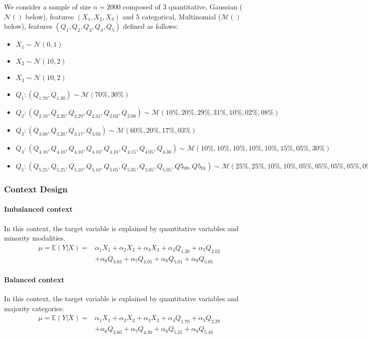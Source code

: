 \documentclass{article}
\theoremstyle{definition}
\begin{document}
We consider a sample of size $n=2000$ composed of 3 quantitative, Gaussian ($\mathcal{N}()$ below), features $(X_1, X_2, X_3)$ and 5 categorical, Multinomial  ($\mathcal{M}()$ below), features $(Q_1, Q_2, Q_3, Q_3, Q_5)$ defined as follows:
{\scriptsize
\begin{itemize}
    \item $X_1 \sim \mathcal{N}(0,1)$
    \item $X_2 \sim \mathcal{N}(10,2)$
    \item $X_3 \sim \mathcal{N}(10,2)$
    \item $Q_1 : (Q_1.70, Q_1.30) \sim \mathcal{M}(70\%, 30\%)$
    \item $Q_2 : (Q_2.10, Q_2.20, Q_2.29, Q_2.31, Q_2.02, Q_2.08) \sim \mathcal{M}(10\%, 20\%, 29\%, 31\%, 10\%, 02\%, 08\%)$
    \item $Q_3 : (Q_3.60, Q_3.20, Q_3.17, Q_3.03) \sim \mathcal{M}(60\%, 20\%, 17\%, 03\%)$
    \item $Q_4 : (Q_4.10, Q_4.10, Q_4.10, Q_4.10, Q_4.10, Q_4.15, Q_4.05,Q_4.30)\sim \mathcal{M}(10\%,10\%,10\%,10\%,10\%, 15\%, 05\%, 30\%)$
    \item $Q_5 : (Q_5.25, Q_5.25, Q_5.10, Q_5.10, Q_5.05, Q_5.05, Q_5.05, Q_5.05, Q5_09, Q5_01)\sim \mathcal{M}(25\%,25\%,10\%,10\%,05\%,05\%,05\%,05\%,09\%,01\%)$
\end{itemize}
}%

\subsubsection{Context Design} \label{contextDesign}
\paragraph{Imbalanced context}
In this context, the target variable is explained by quantitative variables and minority modalities.
{\small
\begin{align*}
    \mu  = \mathbb{E}(Y|X)=& \alpha_1 X_1 + \alpha_2 X_2 + \alpha_3 X_3 +  \alpha_4 Q_1.30  + \alpha_5  Q_2.02 \\ & + \alpha_6 Q_3.03 + \alpha_7 Q_4.05 + \alpha_8 Q_5.01 + \alpha_9 Q_5.05
\end{align*}
}%


\paragraph{Balanced context}
In this context, the target variable is explained by quantitative variables and majority categories: 
{\small
\begin{align*}
    \mu  = \mathbb{E}(Y|X)=& \alpha_1 X_1 + \alpha_2 X_2 + \alpha_3 X_3 + \alpha_4 Q_1.70 + \alpha_5  Q_2.29 \\ &  + \alpha_6 Q_3.60 + \alpha_7 Q_4.30 + \alpha_8 Q_5.25 + \alpha_9 Q_5.10
\end{align*}
}%
\end{document}
